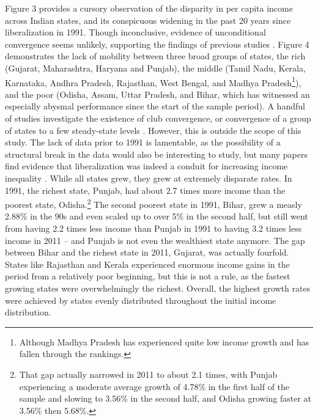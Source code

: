\documentclass[a4paper, 11pt]{article}
\begin{document}
Figure 3 provides a cursory observation of the disparity in per capita income across Indian states, and its conspicuous widening in the past 20 years since liberalization in 1991.  Though inconclusive, evidence of unconditional convergence seems unlikely, supporting the findings of previous studies \citep{bajpai_trends_1996,ghosh_economic_1998,nagaraj_long-run_2000}.  Figure 4 demonstrates the lack of mobility between three broad groups of states, the rich (Gujarat, Maharashtra, Haryana and Punjab), the middle (Tamil Nadu, Kerala, Karnataka, Andhra Pradesh, Rajasthan, West Bengal, and Madhya Pradesh\footnote{Although Madhya Pradesh has experienced quite low income growth and has fallen through the rankings.}), and the poor (Odisha, Assam, Uttar Pradesh, and Bihar, which has witnessed an especially abysmal performance since the start of the sample period). A handful of studies investigate the existence of club convergence, or convergence of a group of states to a few steady-state levels \citep{baddeley_divergence_2006,ghosh_economic_2008,cherodian_regional_2015}.  However, this is outside the scope of this study.  The lack of data prior to 1991 is lamentable, as the possibility of a structural break in the data would also be interesting to study, but many papers find evidence that liberalization was indeed a conduit for increasing income inequality \citep{rao_convergence_1999,baddeley_divergence_2006,ghosh_economic_2008,kalra_growth_2010}.  While all states grew, they grew at extremely disparate rates.  In 1991, the richest state, Punjab, had about 2.7 times more income than the poorest state, Odisha.\footnote{That gap actually narrowed in 2011 to about 2.1 times, with Punjab experiencing a moderate average growth of 4.78\% in the first half of the sample and slowing to 3.56\% in the second half, and Odisha growing faster at 3.56\% then 5.68\%.}  The second poorest state in 1991, Bihar, grew a measly 2.88\% in the 90s and even scaled up to over 5\% in the second half, but still went from having 2.2 times less income than Punjab in 1991 to having 3.2 times less income in 2011 -- and Punjab is not even the wealthiest state anymore.  The gap between Bihar and the richest state in 2011, Gujarat, was actually fourfold.  States like Rajasthan and Kerala experienced enormous income gains in the period from a relatively poor beginning, but this is not a rule, as the fastest growing states were overwhelmingly the richest.  Overall, the highest growth rates were achieved by states evenly distributed throughout the initial income distribution.  \par
\end{document}
